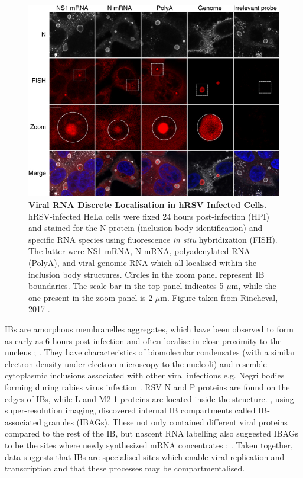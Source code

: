 \begin{figure}
    \centering
    \includegraphics[width=1\linewidth]{04. Introduction/Figs/11. RSV IBs.png}  
    \caption[Viral RNA Discrete Localisation in hRSV Infected Cells.]{\textbf{Viral RNA Discrete Localisation in hRSV Infected Cells.} hRSV-infected HeLa cells were fixed 24 hours post-infection (HPI) and stained for the N protein (inclusion body identification) and specific RNA species using fluorescence \textit{in situ} hybridization (FISH). The latter were NS1 mRNA, N mRNA, polyadenylated RNA (PolyA), and viral genomic RNA which all localised within the inclusion body structures. Circles in the zoom panel represent IB boundaries. The scale bar in the top panel indicates 5 \(\mu\)m, while the one present in the zoom panel is 2 \(\mu\)m. Figure taken from Rincheval, 2017 \cite{Rincheval2017FunctionalVirus}.}
    \label{fig:Viral RNA Discrete Localisation in hRSV Infected Cells}
\end{figure}



IBs are amorphous membranelles aggregates, which have been observed to form as early as 6 hours post-infection and often localise in close proximity to the nucleus \cite{Bachi1973MorphogenesisVirus}; \cite{Jobe2020RespiratorySignaling}. They have characteristics of biomolecular condensates (with a similar electron density under electron microscopy to the nucleoli) and resemble cytoplasmic inclusions associated with other viral infections e.g. Negri bodies forming during rabies virus infection \cite{Nikolic2017NegriOrganelles}. RSV N and P proteins are found on the edges of IBs, while L and M2-1 proteins are located inside the structure. \cite{Rincheval2017FunctionalVirus}, using super-resolution imaging, discovered internal IB compartments called IB-associated granules (IBAGs). These not only contained different viral proteins compared to the rest of the IB, but nascent RNA labelling also suggested IBAGs to be the sites where newly synthesized mRNA concentrates \cite{Jobe2020RespiratorySignaling}; \cite{Richard2018RSVTranscription}. Taken together, data suggests that IBs are specialised sites which enable viral replication and transcription and that these processes may be compartmentalised.

